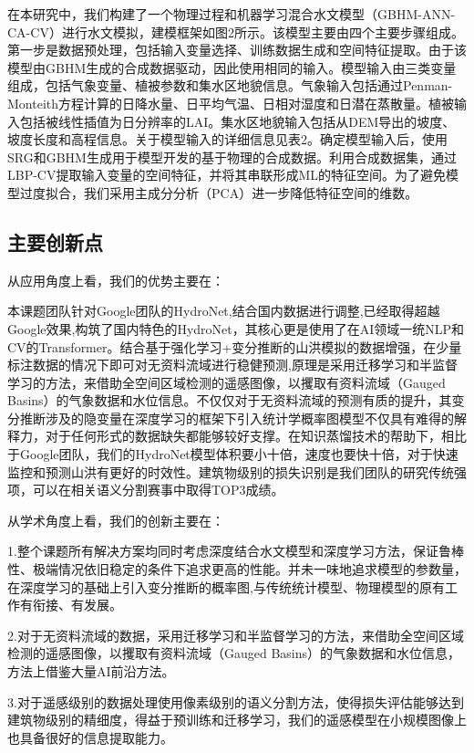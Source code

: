 \documentclass{ctexart}
\begin{document}
在本研究中，我们构建了一个物理过程和机器学习混合水文模型（GBHM-ANN-CA-CV）进行水文模拟，建模框架如图2所示。该模型主要由四个主要步骤组成。第一步是数据预处理，包括输入变量选择、训练数据生成和空间特征提取。由于该模型由GBHM生成的合成数据驱动，因此使用相同的输入。模型输入由三类变量组成，包括气象变量、植被参数和集水区地貌信息。气象输入包括通过Penman-Monteith方程计算的日降水量、日平均气温、日相对湿度和日潜在蒸散量。植被输入包括被线性插值为日分辨率的LAI。集水区地貌输入包括从DEM导出的坡度、坡度长度和高程信息。关于模型输入的详细信息见表2。确定模型输入后，使用SRG和GBHM生成用于模型开发的基于物理的合成数据。利用合成数据集，通过LBP-CV提取输入变量的空间特征，并将其串联形成ML的特征空间。为了避免模型过度拟合，我们采用主成分分析（PCA）进一步降低特征空间的维数。
\subsection{主要创新点}

从应用角度上看，我们的优势主要在：

本课题团队针对Google团队的HydroNet,结合国内数据进行调整,已经取得超越Google效果,构筑了国内特色的HydroNet，其核心更是使用了在AI领域一统NLP和CV的Transformer。结合基于强化学习+变分推断的山洪模拟的数据增强，在少量标注数据的情况下即可对无资料流域进行稳健预测,原理是采用迁移学习和半监督学习的方法，来借助全空间区域检测的遥感图像，以攫取有资料流域（Gauged Basins）的气象数据和水位信息。不仅仅对于无资料流域的预测有质的提升，其变分推断涉及的隐变量在深度学习的框架下引入统计学概率图模型不仅具有难得的解释力，对于任何形式的数据缺失都能够较好支撑。在知识蒸馏技术的帮助下，相比于Google团队，我们的HydroNet模型体积要小十倍，速度也要快十倍，对于快速监控和预测山洪有更好的时效性。建筑物级别的损失识别是我们团队的研究传统强项，可以在相关语义分割赛事中取得TOP3成绩。

从学术角度上看，我们的创新主要在：

1.整个课题所有解决方案均同时考虑深度结合水文模型和深度学习方法，保证鲁棒性、极端情况依旧稳定的条件下追求更高的性能。并未一味地追求模型的参数量，在深度学习的基础上引入变分推断的概率图,与传统统计模型、物理模型的原有工作有衔接、有发展。

2.对于无资料流域的数据，采用迁移学习和半监督学习的方法，来借助全空间区域检测的遥感图像，以攫取有资料流域（Gauged Basins）的气象数据和水位信息，方法上借鉴大量AI前沿方法。

3.对于遥感级别的数据处理使用像素级别的语义分割方法，使得损失评估能够达到建筑物级别的精细度，得益于预训练和迁移学习，我们的遥感模型在小规模图像上也具备很好的信息提取能力。
\end{document}
